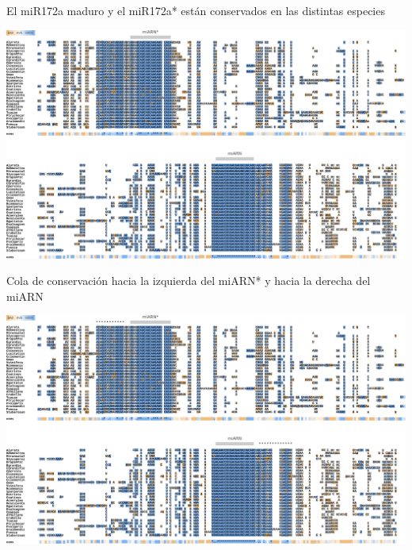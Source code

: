 \documentclass{beamer}
\begin{document}
\begin{frame}{El miR172a maduro y el miR172a* están conservados en las distintas especies}
	\begin{center}
		\includegraphics[width=1\textwidth]{img/miR172a_tcoffee_02.png}
	\end{center}
\end{frame}

\begin{frame}{Cola de conservación hacia la izquierda del miARN* y hacia la derecha del miARN}
	\begin{center}
		\includegraphics[width=1\textwidth]{img/miR172a_tcoffee_03.png}
	\end{center}
\end{frame}
\end{document}
